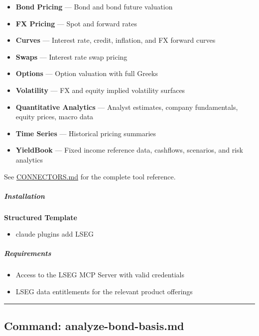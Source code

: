 \documentclass[11pt]{article}
\begin{document}
\begin{itemize}[leftmargin=*,itemsep=2pt,topsep=2pt]
\item {} \textbf{Bond Pricing} — Bond and bond future valuation
\item {} \textbf{FX Pricing} — Spot and forward rates
\item {} \textbf{Curves} — Interest rate, credit, inflation, and FX forward curves
\item {} \textbf{Swaps} — Interest rate swap pricing
\item {} \textbf{Options} — Option valuation with full Greeks
\item {} \textbf{Volatility} — FX and equity implied volatility surfaces
\item {} \textbf{Quantitative Analytics} — Analyst estimates, company fundamentals, equity prices, macro data
\item {} \textbf{Time Series} — Historical pricing summaries
\item {} \textbf{YieldBook} — Fixed income reference data, cashflows, scenarios, and risk analytics
\end{itemize}

See \href{CONNECTORS.md}{CONNECTORS.md} for the complete tool reference.


\subparagraph{Installation}\mbox{}\par

\textbf{Structured Template}
\begin{itemize}[leftmargin=*,itemsep=2pt,topsep=2pt]
\item {} claude plugins add LSEG
\end{itemize}

\subparagraph{Requirements}\mbox{}\par

\begin{itemize}[leftmargin=*,itemsep=2pt,topsep=2pt]
\item {} Access to the LSEG MCP Server with valid credentials
\item {} LSEG data entitlements for the relevant product offerings
\end{itemize}

\vspace{0.8em}\hrule\vspace{0.8em}

\subsection{Command: analyze-bond-basis.md}\label{file:lseg-commands-analyze-bond-basis.md}
\end{document}
